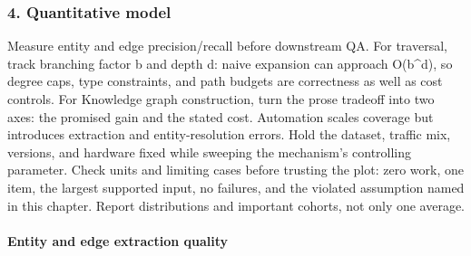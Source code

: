 \subsubsection*{4. Quantitative model}
Measure entity and edge precision/recall before downstream QA. For traversal, track branching factor b and depth d: naive expansion can approach O(b\textasciicircum{}d), so degree caps, type constraints, and path budgets are correctness as well as cost controls.
For Knowledge graph construction, turn the prose tradeoff into two axes: the promised gain and the stated cost. Automation scales coverage but introduces extraction and entity-resolution errors. Hold the dataset, traffic mix, versions, and hardware fixed while sweeping the mechanism's controlling parameter.
Check units and limiting cases before trusting the plot: zero work, one item, the largest supported input, no failures, and the violated assumption named in this chapter. Report distributions and important cohorts, not only one average.
\paragraph{Entity and edge extraction quality}
